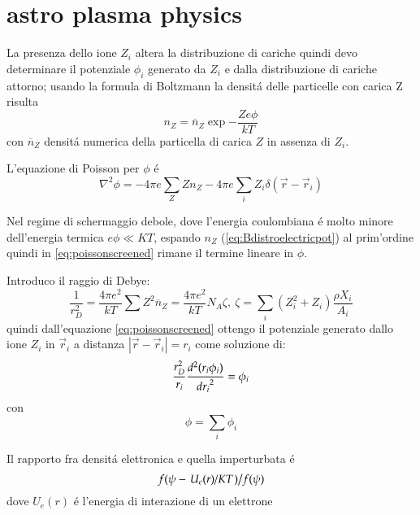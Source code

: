 \documentclass[main.tex]{subfiles}
\begin{document}
\chapter{astro plasma physics}

La presenza dello ione $Z_i$ altera la distribuzione di cariche quindi devo determinare il potenziale $\phi_i$ generato da $Z_i$ e dalla distribuzione di cariche attorno; usando la formula di Boltzmann la densit\'a delle particelle con carica Z risulta
\begin{equation}\label{eq:Bdistroelectricpot}
n_Z=\overline{n}_Z\exp{-\frac{Ze\phi}{kT}}
\end{equation}
con $\overline{n}_Z$ densit\'a numerica della particella di carica $Z$ in assenza di $Z_i$.

L'equazione di Poisson per $\phi$ \'e
\begin{equation}\label{eq:poissonscreened}
\nabla^2\phi=-4\pi e\sum_Z Zn_Z-4\pi e\sum_i Z_i\delta(\vec{r}-\vec{r}_i)
\end{equation}

Nel regime di schermaggio debole, dove l'energia coulombiana \'e molto minore dell'energia termica $e\phi\ll KT$, espando $n_Z$ (\eqref{eq:Bdistroelectricpot}) al prim'ordine quindi in \eqref{eq:poissonscreened} rimane il termine lineare in $\phi$.

Introduco il raggio di Debye:
\begin{equation}
\frac{1}{r_D^2}=\frac{4\pi e^2}{kT}\sum Z^2\overline{n}_Z=\frac{4\pi e^2}{kT}N_A\zeta,\ \zeta=\sum_{i}(Z_i^2+Z_i)\frac{\rho X_i}{A_i}\label{eq:debyeradius}
\end{equation}
quindi dall'equazione \eqref{eq:poissonscreened} ottengo il potenziale generato dallo ione $Z_i$ in $\vec{r}_i$ a distanza $|\vec{r}-\vec{r}_i|=r_i$ come soluzione di:
\begin{equation}\label{eq:poissonspheric}
\frac{r_D^2}{r_i}\TtwoDy{r_i}{(r_i\phi_i)}=\phi_i
\end{equation}
con
\begin{equation}
\phi=\sum_i\phi_i
\end{equation}

\begin{workout}
Il rapporto fra densit\'a elettronica e quella imperturbata \'e
\begin{equation}
\midfrac{f(\psi-\midfrac{U_e(r)}{KT})}{f(\psi)}
\end{equation}
dove $U_e(r)$ \'e l'energia di interazione di un elettrone
\end{workout}
\end{document}
